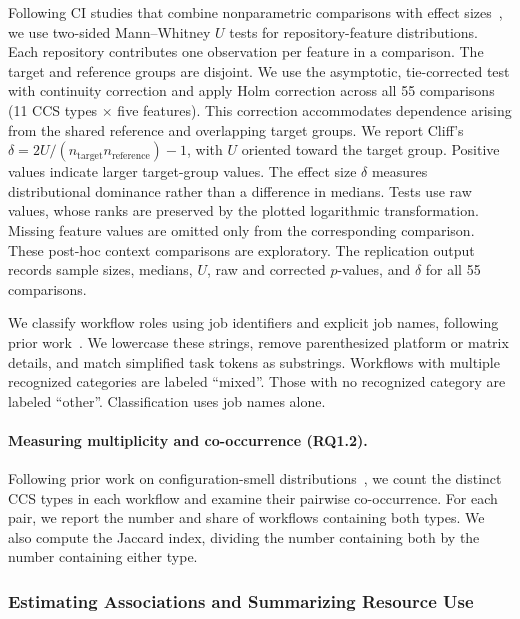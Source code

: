 \documentclass[smallextended]{svjour3}
\begin{document}
Following CI studies that combine nonparametric comparisons with effect sizes~\citep{ghaleb2019empirical}, we use two-sided Mann--Whitney $U$ tests for repository-feature distributions. Each repository contributes one observation per feature in a comparison. The target and reference groups are disjoint. We use the asymptotic, tie-corrected test with continuity correction and apply Holm correction across all 55 comparisons (11 CCS types $\times$ five features). This correction accommodates dependence arising from the shared reference and overlapping target groups. We report Cliff's $\delta=2U/(n_\mathrm{target}n_\mathrm{reference})-1$, with $U$ oriented toward the target group. Positive values indicate larger target-group values. The effect size $\delta$ measures distributional dominance rather than a difference in medians. Tests use raw values, whose ranks are preserved by the plotted logarithmic transformation. Missing feature values are omitted only from the corresponding comparison. These post-hoc context comparisons are exploratory. The replication output records sample sizes, medians, $U$, raw and corrected $p$-values, and $\delta$ for all 55 comparisons.

We classify workflow roles using job identifiers and explicit job names, following prior work~\citep{bouzenia2024resource}. We lowercase these strings, remove parenthesized platform or matrix details, and match simplified task tokens as substrings. Workflows with multiple recognized categories are labeled ``mixed''. Those with no recognized category are labeled ``other''. Classification uses job names alone.

\paragraph{Measuring multiplicity and co-occurrence (RQ1.2).}

Following prior work on configuration-smell distributions~\citep{wu2020dockerfilesmells}, we count the distinct CCS types in each workflow and examine their pairwise co-occurrence. For each pair, we report the number and share of workflows containing both types. We also compute the Jaccard index, dividing the number containing both by the number containing either type.

\subsubsection{Estimating Associations and Summarizing Resource Use}
\label{sec:rq2-common}
\end{document}
